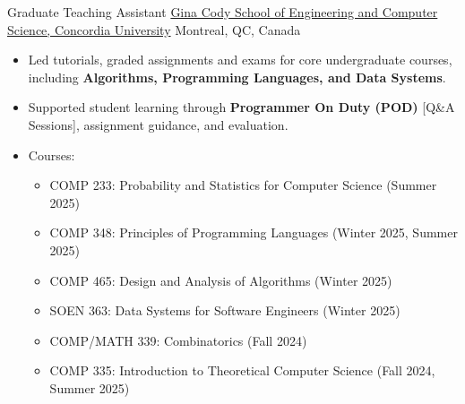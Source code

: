 \documentclass[10pt,a4paper,sans]{moderncv}        %
\begin{document}
  {Graduate Teaching Assistant}
  {\href{https://www.concordia.ca/ginacody.html}{Gina Cody School of Engineering and Computer Science, Concordia University}}
  {Montreal, QC, Canada}
  {}
  {\begin{itemize}%
    \item Led tutorials, graded assignments and exams for core undergraduate courses, including \textbf{Algorithms, Programming Languages, and Data Systems}.
    \item Supported student learning through \textbf{Programmer On Duty (POD)} [Q\&A Sessions], assignment guidance, and evaluation.
    \item Courses:  
      \begin{itemize}%
        \item COMP 233: Probability and Statistics for Computer Science (Summer 2025)  
        \item COMP 348: Principles of Programming Languages (Winter 2025, Summer 2025)  
        \item COMP 465: Design and Analysis of Algorithms (Winter 2025)  
        \item SOEN 363: Data Systems for Software Engineers (Winter 2025)  
        \item COMP/MATH 339: Combinatorics (Fall 2024)  
        \item COMP 335: Introduction to Theoretical Computer Science (Fall 2024, Summer 2025)  
      \end{itemize}
  \end{itemize}}

\vspace*{-2mm}
\subsection{}
\end{document}
